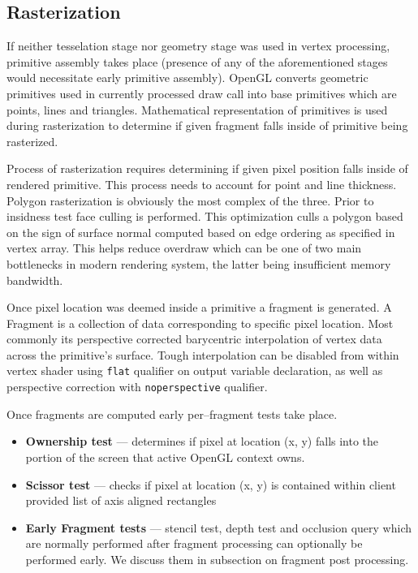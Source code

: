 \subsection{Rasterization}

If neither tesselation stage nor geometry stage was used in vertex processing, primitive assembly takes place (presence of any of the aforementioned stages would necessitate early primitive assembly). 
OpenGL converts geometric primitives used in currently processed draw call into base primitives which are points, lines and triangles.
Mathematical representation of primitives is used during rasterization to determine if given fragment falls inside of primitive being rasterized.

Process of rasterization requires determining if given pixel position falls inside of rendered primitive. This process needs to account for point and line thickness.
Polygon rasterization is obviously the most complex of the three. Prior to insidness test face culling is performed. 
This optimization culls a polygon based on the sign of surface normal computed based on edge ordering as specified in vertex array.
This helps reduce overdraw which can be one of two main bottlenecks in modern rendering system, the latter being insufficient memory bandwidth.

Once pixel location was deemed inside a primitive a fragment is generated. 
A Fragment is a collection of data corresponding to specific pixel location.
Most commonly its perspective corrected barycentric interpolation of vertex data across the primitive's surface.
Tough interpolation can be disabled from within vertex shader using \texttt{flat} qualifier on output variable declaration,
as well as perspective correction with \texttt{noperspective} qualifier.

Once fragments are computed early per--fragment tests take place.

\begin{itemize}
    \item \textbf{Ownership test} --- determines if pixel at location (x, y) falls into the portion of the screen that active OpenGL context owns.
    \item \textbf{Scissor test} --- checks if pixel at location (x, y) is contained within client provided list of axis aligned rectangles
    \item \textbf{Early Fragment tests} --- stencil test, depth test and occlusion query which are normally performed after fragment processing can optionally be performed early. We discuss them in subsection on fragment post processing.
\end{itemize}

